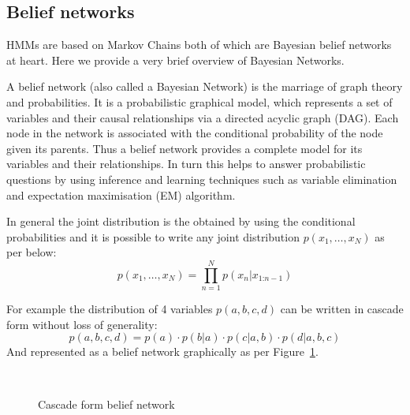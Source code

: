 \subsection{Belief networks}

HMMs are based on Markov Chains both of which are Bayesian belief networks at heart. Here we provide a very brief overview of Bayesian Networks.

A belief network (also called a Bayesian Network) is the marriage of graph theory and probabilities. It is a probabilistic graphical model, which represents a set of variables and their causal relationships via a directed acyclic graph (DAG). Each node in the network is associated with the conditional probability of the node given its parents. Thus a belief network provides a complete model for its variables and their relationships. In turn this helps to answer probabilistic questions by using inference and learning techniques such as variable elimination and expectation maximisation (EM) algorithm.

In general the joint distribution is the obtained by using the conditional probabilities and it is possible to write any joint distribution $p{( x_1,\dots,x_N)}$ as per below:
\begin{equation}
    p{(x_1,\dots,x_N)} = \prod_{n=1}^{N} p{(x_n|x_{1\text{:}n-1})}
\end{equation}

For example the distribution of 4 variables $p{(a,b,c,d)}$ can be written in cascade form without loss of generality:
\begin{equation}
    p{(a,b,c,d)} = 
        p{(a)} \cdot
        p{(b|a)} \cdot
        p{(c|a,b)} \cdot
        p{(d|a,b,c)}
\end{equation}
And represented as a belief network graphically as per Figure~\ref{Ch2Fig:4}.


\begin{figure}[!ht]\centering
    \strut\\
    \caption{Cascade form belief network}\label{Ch2Fig:4}
\end{figure}



